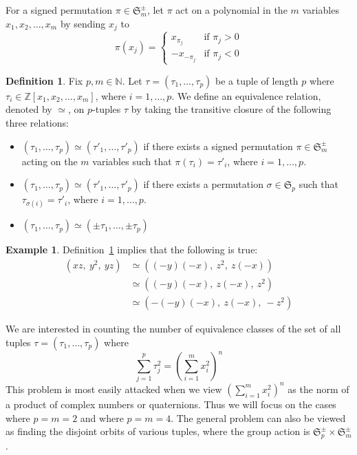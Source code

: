 \documentclass[12pt]{article}
\theoremstyle{definition}
\newtheorem{definition}[theorem]{Definition}
\newtheorem{example}[theorem]{Example}
\numberwithin{equation}{section}
\begin{document}

For a signed permutation \( \pi \in \mathfrak{S}_m^\pm \), let \( \pi \) act on a polynomial in the 
\(m\) variables \( x_1,x_2, \ldots, x_m \) by sending \( x_j \) to 
\[
\pi(x_j) =
\begin{cases}
x_{\pi_j} & \text{if } \pi_j > 0 \\
-x_{-\pi_j} & \text{if } \pi_j < 0
\end{cases}
\]

\begin{definition}
\label{def:general}
Fix \( p, m \in \mathbb{N} \). 
Let \( \tau = ( \tau_1, \ldots, \tau_p) \)
be a tuple of length \( p \) where 
\( \tau_i \in \mathbb{Z}[x_1,x_2, \ldots, x_m] \), where \( i = 1, \ldots, p \).
We define an equivalence relation, denoted by \( \simeq \), on \(p\)-tuples
\( \tau \) 
by taking the transitive closure of the following three relations:
\begin{itemize}
\item
\( ( \tau_1, \ldots, \tau_p) \simeq ( \tau'_1, \ldots, \tau'_p) \)
if there exists a signed permutation \( \pi \in \mathfrak{S}_m^\pm \)
acting on the \( m \) variables such that \( \pi( \tau_i ) = \tau'_i \),
 where \( i = 1, \ldots, p \).
\item
\( ( \tau_1, \ldots, \tau_p) \simeq ( \tau'_1, \ldots, \tau'_p) \)
if there exists a permutation \( \sigma \in \mathfrak{S}_p \)
such that \( \tau_{\sigma(i)} = \tau'_i \), where \( i = 1, \ldots, p \).
\item
\( ( \tau_1, \ldots, \tau_p) \simeq ( \pm \tau_1, \ldots, \pm \tau_p) \)
\end{itemize}
\end{definition}


\begin{example}
Definition~\ref{def:general} implies that the following is true:
\begin{align*}
( xz,\: y^2,\: yz )  
&\simeq ( (-y)(-x),\: z^2,\: z(-x) ) \\
&\simeq ( (-y)(-x),\: z(-x),\: z^2 ) \\
&\simeq ( -(-y)(-x),\: z(-x),\: -z^2 ) 
\end{align*}
\end{example}



We are interested in counting the number of
equivalence classes of the set of all tuples
 \( \tau = ( \tau_1, \ldots, \tau_p) \)
where
\[
\sum_{j = 1}^{p}  \tau_j ^ 2  
= 
\left( \sum_{i = 1}^{m}  x_i ^ 2  \right) ^ n 
\] 
This problem is most easily attacked when we
view \( \left( \sum_{i = 1}^{m}  x_i ^ 2  \right) ^ n \)
as the norm of a product of complex numbers or quaternions.
Thus we will focus on the cases where \( p = m = 2 \) and where \( p = m = 4 \).
The general problem can also be viewed as finding the disjoint orbits of 
various tuples, where the group action is \( \mathfrak{S}_p^\pm \times \mathfrak{S}_m^\pm \).
\end{document}

